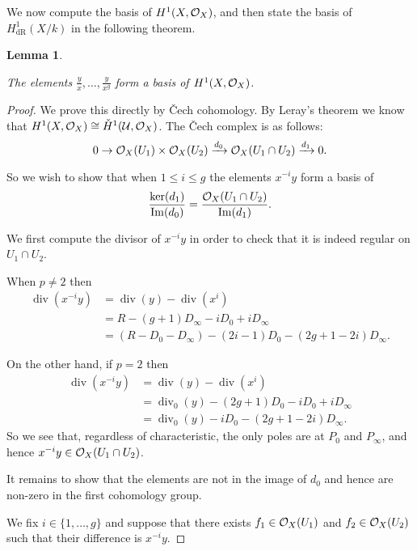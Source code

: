 \documentclass[draft, 11pt]{article} %
\theoremstyle{plain}
\newtheorem{lem}[defn]{Lemma}
\theoremstyle{remark}
\newcommand{\cO}{{\cal O}}
\newcommand{\cU}{{\mathcal U}}
\newcommand{\cech}{\v{C}ech }
\newcommand{\derhamhone}{H_{\text {dR}}^1(X/k)}
\DeclareMathOperator{\di}{div}
\DeclareMathOperator{\Ima}{Im}
\begin{document}
We now compute the basis of $H^1(X,\cO_X)$, and then state the basis of $\derhamhone$ in the following theorem.\\
\begin{lem}\label{basish1}
 
 The elements $\frac{y}{x}, \ldots , \frac{y}{x^g}$ form a basis of $H^1(X,\cO_X)$.
 
\end{lem}
\begin{proof}
 
We prove this directly by \cech cohomology.
By Leray's theorem we know that $H^1(X,\cO_X) \cong \check{H}^1(\cU,\cO_X)$.
The \cech complex is as follows:
\begin{equation*}
0 \rightarrow \cO_X(U_1) \times \cO_X(U_2) \xrightarrow{d_0} \cO_X(U_1 \cap U_2) \xrightarrow{d_1} 0.
\end{equation*}

So we wish to show that when $1 \leq i \leq g$ the elements $x^{-i}y$ form a basis of 
\begin{equation*}
\frac{\ker (d_1)}{\Ima (d_0)} = \frac{ \cO_X(U_1 \cap U_2)}{\Ima (d_1)}.
\end{equation*}


We first compute the divisor of $x^{-i}y$ in order to check that it is indeed regular on $U_1 \cap U_2$.

When $p \neq 2$ then
\begin{align*}
    \di(x^{-i}y) & = \di(y) - \di(x^i) \\
    & = R - (g+1)D_\infty - iD_0 + iD_\infty \\
    & = (R - D_0 - D_\infty) -(2i-1)D_0 - (2g +1 -2i)D_\infty.
\end{align*}

On the other hand, if $p =2$ then 
\begin{align*}
    \di(x^{-i}y) & = \di(y) - \di(x^i) \\
    & = \di_0(y) - (2g+1)D_0 -iD_0 + iD_\infty \\
    & = \di_0(y) -iD_0 - ( 2g + 1 -2i)D_\infty.
\end{align*}
So we see that, regardless of characteristic, the only poles are at $P_0$ and $P_\infty$, and hence $x^{-i}y \in \cO_X(U_1 \cap U_2)$.

It remains to show that the elements are not in the image of $d_0$ and hence are non-zero in the first cohomology group.

We  fix $i \in \{1, \ldots, g\}$ and suppose that there exists $f_1 \in \cO_X(U_1)$ and $f_2 \in \cO_X(U_2)$ such that their difference is $x^{-i}y$.



\end{proof}
\end{document}
